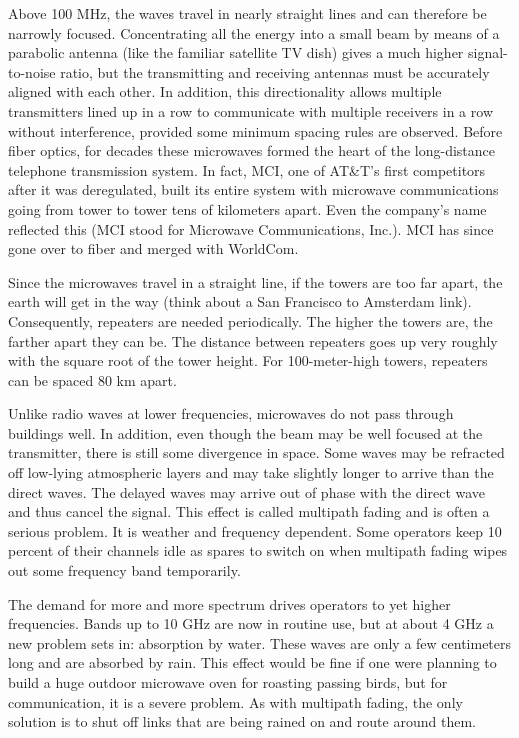 Above 100 MHz, the waves travel in nearly straight lines and can
therefore be narrowly focused. Concentrating all the energy into a small
beam by means of a parabolic antenna (like the familiar satellite TV
dish) gives a much higher signal-to-noise ratio, but the transmitting
and receiving antennas must be accurately aligned with each other. In
addition, this directionality allows multiple transmitters lined up in a
row to communicate with multiple receivers in a row without
interference, provided some minimum spacing rules are observed. Before
fiber optics, for decades these microwaves formed the heart of the
long-distance telephone transmission system. In fact, MCI, one of
AT\&T's first competitors after it was deregulated, built its entire
system with microwave communications going from tower to tower tens of
kilometers apart. Even the company's name reflected this (MCI stood for
Microwave Communications, Inc.). MCI has since gone over to fiber and
merged with WorldCom.

Since the microwaves travel in a straight line, if the towers are too
far apart, the earth will get in the way (think about a San Francisco to
Amsterdam link). Consequently, repeaters are needed periodically. The
higher the towers are, the farther apart they can be. The distance
between repeaters goes up very roughly with the square root of the tower
height. For 100-meter-high towers, repeaters can be spaced 80 km apart.

Unlike radio waves at lower frequencies, microwaves do not pass through
buildings well. In addition, even though the beam may be well focused at
the transmitter, there is still some divergence in space. Some waves may
be refracted off low-lying atmospheric layers and may take slightly
longer to arrive than the direct waves. The delayed waves may arrive out
of phase with the direct wave and thus cancel the signal. This effect is
called {multipath fading} and is often a serious problem. It is weather
and frequency dependent. Some operators keep 10 percent of their
channels idle as spares to switch on when multipath fading wipes out
some frequency band temporarily.

The demand for more and more spectrum drives operators to yet higher
frequencies. Bands up to 10 GHz are now in routine use, but at about 4
GHz a new problem sets in: absorption by water. These waves are only a
few centimeters long and are absorbed by rain. This effect would be fine
if one were planning to build a huge outdoor microwave oven for roasting
passing birds, but for communication, it is a severe problem. As with
multipath fading, the only solution is to shut off links that are being
rained on and route around them.

